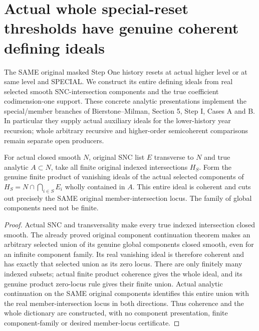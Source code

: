 \section{Actual whole special-reset thresholds have genuine coherent defining ideals}

The SAME original masked Step One history resets at actual higher level or at
same level and SPECIAL. We construct its entire defining ideals from real
selected smooth SNC-intersection components and the true coefficient
codimension-one support. These concrete analytic presentations implement the
special/member branches of Bierstone--Milman\cite{bierstone-milman08-functoriality},
Section 5, Step I, Cases A and B. In particular they supply actual auxiliary
ideals for the lower-history year recursion; whole arbitrary recursive and
higher-order semicoherent comparisons remain separate open producers.

\begin{theorem}
\label{hir:original-special-member-locus-coherent-component-ideal}
\leanok
{}
For actual closed smooth $N$, original SNC list $E$ transverse to $N$ and true
analytic $A\subset N$, take all finite original indexed intersections $H_S$.
Form the genuine finite product of vanishing ideals of the actual selected
components of $H_S=N\cap\bigcap_{i\in S}E_i$ wholly contained in $A$.
This entire ideal is coherent and cuts out precisely the SAME original
member-intersection locus. The family of global components need not be finite.
\end{theorem}
\begin{proof}
Actual SNC and transversality make every true indexed intersection closed
smooth. The already proved original component continuation theorem makes
an arbitrary selected union of its genuine global components closed smooth,
even for an infinite component family. Its real vanishing ideal is therefore
coherent and has exactly that selected union as its zero locus. There are
only finitely many indexed subsets; actual finite product coherence gives
the whole ideal, and its genuine product zero-locus rule gives their finite
union. Actual analytic continuation on the SAME original components identifies
this entire union with the real member-intersection locus in both directions.
Thus coherence and the whole dictionary are constructed, with no component
presentation, finite component-family or desired member-locus certificate.
\end{proof}

